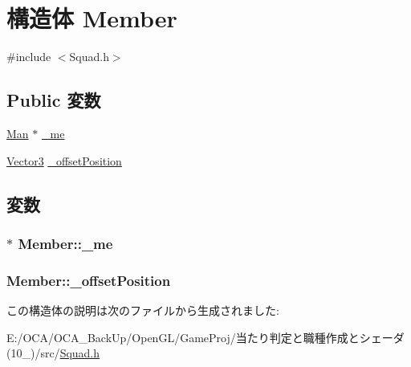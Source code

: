 \hypertarget{struct_member}{\section{構造体 Member}
\label{struct_member}
}


{\ttfamily \#include $<$Squad.\-h$>$}

\subsection*{Public 変数}
\begin{DoxyCompactItemize}
\item 
\hyperlink{class_man}{Man} $\ast$ \hyperlink{struct_member_ab1447d224c4183eb6b1e664bdd91d683}{\-\_\-me}
\item 
\hyperlink{struct_vector3}{Vector3} \hyperlink{struct_member_a9a074540cac9305508993950a04636fd}{\-\_\-offset\-Position}
\end{DoxyCompactItemize}


\subsection{変数}
\hypertarget{struct_member_ab1447d224c4183eb6b1e664bdd91d683}{
\subsubsection[{\-\_\-me}]{$\ast$ Member\-::\-\_\-me}}\label{struct_member_ab1447d224c4183eb6b1e664bdd91d683}
\hypertarget{struct_member_a9a074540cac9305508993950a04636fd}{
\subsubsection[{\-\_\-offset\-Position}]{ Member\-::\-\_\-offset\-Position}}\label{struct_member_a9a074540cac9305508993950a04636fd}


この構造体の説明は次のファイルから生成されました\-:\begin{DoxyCompactItemize}
\item 
E\-:/\-O\-C\-A/\-O\-C\-A\-\_\-\-Back\-Up/\-Open\-G\-L/\-Game\-Proj/当たり判定と職種作成とシェーダ(10\-\_)/src/\hyperlink{_squad_8h}{Squad.\-h}\end{DoxyCompactItemize}
